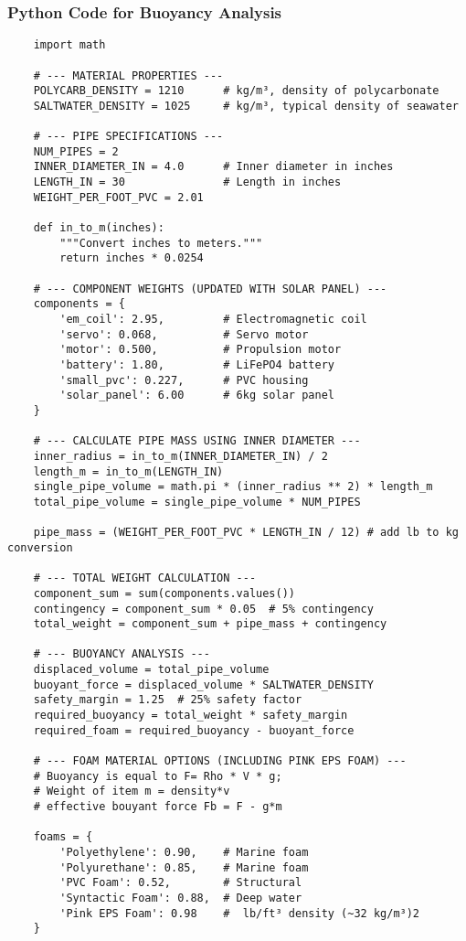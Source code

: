 \subsubsection{Python Code for Buoyancy Analysis}
\begin{verbatim}
    import math
    
    # --- MATERIAL PROPERTIES ---
    POLYCARB_DENSITY = 1210      # kg/m³, density of polycarbonate
    SALTWATER_DENSITY = 1025     # kg/m³, typical density of seawater
    
    # --- PIPE SPECIFICATIONS ---
    NUM_PIPES = 2
    INNER_DIAMETER_IN = 4.0      # Inner diameter in inches
    LENGTH_IN = 30               # Length in inches
    WEIGHT_PER_FOOT_PVC = 2.01
    
    def in_to_m(inches):
        """Convert inches to meters."""
        return inches * 0.0254
    
    # --- COMPONENT WEIGHTS (UPDATED WITH SOLAR PANEL) ---
    components = {
        'em_coil': 2.95,         # Electromagnetic coil
        'servo': 0.068,          # Servo motor
        'motor': 0.500,          # Propulsion motor
        'battery': 1.80,         # LiFePO4 battery
        'small_pvc': 0.227,      # PVC housing
        'solar_panel': 6.00      # 6kg solar panel
    }
    
    # --- CALCULATE PIPE MASS USING INNER DIAMETER ---
    inner_radius = in_to_m(INNER_DIAMETER_IN) / 2
    length_m = in_to_m(LENGTH_IN)
    single_pipe_volume = math.pi * (inner_radius ** 2) * length_m
    total_pipe_volume = single_pipe_volume * NUM_PIPES
    
    pipe_mass = (WEIGHT_PER_FOOT_PVC * LENGTH_IN / 12) # add lb to kg conversion
    
    # --- TOTAL WEIGHT CALCULATION ---
    component_sum = sum(components.values())
    contingency = component_sum * 0.05  # 5% contingency
    total_weight = component_sum + pipe_mass + contingency
    
    # --- BUOYANCY ANALYSIS ---
    displaced_volume = total_pipe_volume
    buoyant_force = displaced_volume * SALTWATER_DENSITY
    safety_margin = 1.25  # 25% safety factor
    required_buoyancy = total_weight * safety_margin
    required_foam = required_buoyancy - buoyant_force
    
    # --- FOAM MATERIAL OPTIONS (INCLUDING PINK EPS FOAM) ---
    # Buoyancy is equal to F= Rho * V * g;
    # Weight of item m = density*v
    # effective bouyant force Fb = F - g*m
    
    foams = {
        'Polyethylene': 0.90,    # Marine foam
        'Polyurethane': 0.85,    # Marine foam
        'PVC Foam': 0.52,        # Structural
        'Syntactic Foam': 0.88,  # Deep water
        'Pink EPS Foam': 0.98    #  lb/ft³ density (~32 kg/m³)2
    }
    

\end{verbatim}
